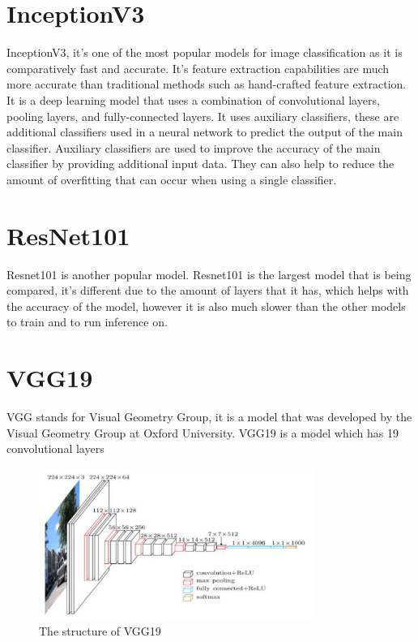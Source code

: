 \documentclass[]{final_report}
\begin{document}


\section{InceptionV3}
InceptionV3\cite{DBLP:journals/corr/SzegedyVISW15}, it's one of the most popular models for image classification as it is comparatively fast and accurate.
It's feature extraction capabilities are much more accurate than traditional methods such as hand-crafted feature extraction. 
It is a deep learning model that uses a combination of convolutional layers, pooling layers, and fully-connected layers. 
It uses auxiliary classifiers, these are additional classifiers used in a neural network to predict the output of the main classifier. Auxiliary classifiers are used to improve the accuracy of the main classifier by providing additional input data. 
They can also help to reduce the amount of overfitting that can occur when using a single classifier.

\section{ResNet101}
Resnet101\cite{DBLP:journals/corr/HeZRS15} is another popular model.
Resnet101 is the largest model that is being compared, it's different due to the amount of layers that it has, 
which helps with the accuracy of the model, however it is also much slower than the other models to train and to run inference on.

\section{VGG19}
VGG stands for Visual Geometry Group, it is a model that was developed by the Visual Geometry Group at Oxford University.
VGG19\cite{Simonyan15} is a model which has 19 convolutional layers

\begin{figure}[ht!]
  \centering
  \includegraphics[width=0.8\textwidth]{images/VGG19-architecture.png}
  \caption{The structure of VGG19\cite{Simonyan15}}
  \label{fig:vgg19-structure}
\end{figure}
\end{document}
